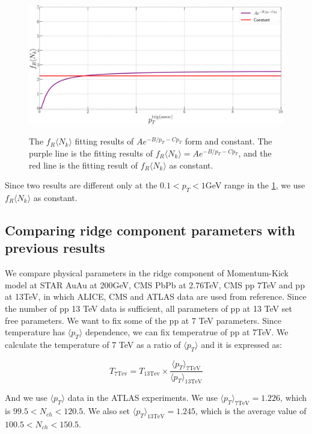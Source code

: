 \documentclass[jkps,fleqn,showpacs,showkeys]{revtex4}
\begin{document}
\begin{figure}[ht]
\centering
\includegraphics[width=12cm, height=6cm]{./Figures/ptVSnone}
\caption{The $f_R\langle N_k \rangle$ fitting results of $Ae^{-{B} / p_T -C p_{T}}$ form and constant. The purple line is the fitting results of $f_R\langle N_k \rangle = Ae^{-{B} / p_T -C p_{T}}$, and the red line is the fitting result of $f_R\langle N_k \rangle$ as constant. }
\label{figure:ptVSnone}
\end{figure}

Since two results are different only at the $0.1<p_T<1$GeV range in the \ref{figure:ptVSnone}, we use $f_R\langle N_k \rangle$ as constant.


\subsection{Comparing ridge component parameters with previous results}
\label{subsec: comparing parameter}


We compare physical parameters in the ridge component of Momentum-Kick model at STAR AuAu at 200GeV\cite{Wong_1}, CMS PbPb at 2.76TeV\cite{PbPb}, CMS pp 7TeV\cite{cms} and pp at 13TeV, in which ALICE, CMS and ATLAS data are used from reference\cite{alice, cms, atlas}.
Since the number of pp 13 TeV data is sufficient, all parameters of pp at 13 TeV set free parameters.
We want to fix some of the pp at 7 TeV parameters.
Since temperature has $\langle p_T \rangle$ dependence, we can fix temperatrue of pp at 7TeV.
We calculate the temperature of 7 TeV as a ratio of $\langle p_T \rangle$ and it is expressed as:

\begin{equation} \label{equation:Tempratio}
T_{7 \text{Tev}} = T_{13 \text{Tev}} \times \frac{\langle p_T \rangle_{7 \text{TeV}}}{\langle p_T \rangle_{13 \text{TeV}}}
\end{equation}

And we use $\langle p_T \rangle$ data in the ATLAS experiments\cite{}.
We use $\langle p_T \rangle _{7 \text{TeV}} = 1.226$, which is $99.5 < N_{ch} <120.5$.
We also set $\langle p_T \rangle _{13 \text{TeV}} = 1.245$, which is the average value of $100.5 < N_{ch} <150.5$.
\end{document}
